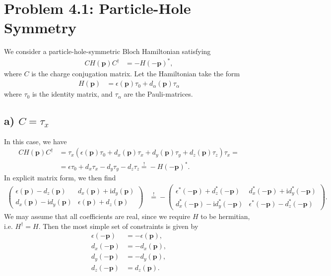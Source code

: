 \documentclass[english, parskip=full]{scrartcl}
\title{\titel}
\author{\autor}
\date{\today}
\newcommand{\kla}{}
\renewcommand{\i}{\text{i}}
\begin{document}
\maketitle  %

\section*{Problem 4.1: Particle-Hole Symmetry}
We consider a particle-hole-symmetric Bloch Hamiltonian satisfying
\begin{align}
CH(\mathbf{p})C^\dagger &= -H(-\mathbf{p})^\ast,
\end{align}
where $C$ is the charge conjugation matrix.
Let the Hamiltonian take the form
\begin{align}
H(\mathbf{p}) &= \epsilon(\mathbf{p}) \tau_0 + d_\alpha (\mathbf{p}) \tau_\alpha
\end{align}
where $\tau_0$ is the identity matrix, and $\tau_\alpha$ are the Pauli-matrices.

\subsection*{a) $C=\tau_x$}
In this case, we have
\begin{align}
CH(\mathbf{p})C^\dagger &= \tau_x \kla\left( \epsilon(\mathbf{p}) \tau_0 + d_x (\mathbf{p}) \tau_x  + d_y (\mathbf{p}) \tau_y + d_z (\mathbf{p}) \tau_z \right) \tau_x = \\
&= \epsilon\tau_0 + d_x\tau_x - d_y\tau_y - d_z\tau_z \overset{!}{=} -H(-\mathbf{p})^\ast.
\end{align}
In explicit matrix form, we then find
\begin{align}
\begin{pmatrix}
\epsilon (\mathbf{p}) - d_z(\mathbf{p}) & d_x(\mathbf{p}) + \i d_y (\mathbf{p}) \\ 
d_x (\mathbf{p}) - \i d_y(\mathbf{p}) & \epsilon(\mathbf{p}) + d_z (\mathbf{p})
\end{pmatrix} &\overset{!}{=} -\begin{pmatrix}
\epsilon^\ast (-\mathbf{p}) + d_z^\ast(-\mathbf{p}) & d_x^\ast(-\mathbf{p}) + \i d_y^\ast(-\mathbf{p}) \\ 
d_x^\ast (-\mathbf{p})  - \i d_y^\ast(-\mathbf{p}) & \epsilon^\ast(-\mathbf{p}) - d_z^\ast (-\mathbf{p})
\end{pmatrix}.
\end{align}
We may assume that all coefficients are real, since we require $H$ to be hermitian, i.e. $H^\dagger = H$.
Then the most simple set of constraints is given by
\begin{align}
\epsilon (-\mathbf{p}) &= -\epsilon (\mathbf{p}),\\
d_x (-\mathbf{p}) &= -d_x (\mathbf{p}),\\
d_y (-\mathbf{p}) &= -d_y (\mathbf{p}),\\
d_z (-\mathbf{p}) &= d_z (\mathbf{p}).
\end{align}
\end{document}
